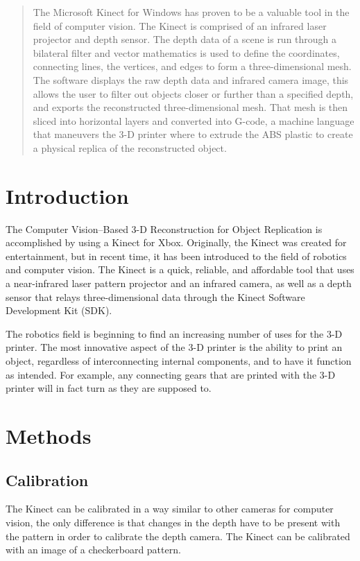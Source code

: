 \documentclass[pdftex,10.5pt]{report}
\begin{document}


\begin{abstract}
The Microsoft Kinect for Windows has proven to be a valuable tool in the field of computer vision. The Kinect is comprised of an infrared laser projector and depth sensor. The depth data of a scene is run through a bilateral filter and vector mathematics is used to define the coordinates, connecting lines, the vertices, and edges to form a three-dimensional mesh. The software displays the raw depth data and infrared camera image, this allows the user to filter out objects closer or further than a specified depth, and exports the reconstructed three-dimensional mesh. That mesh is then sliced into horizontal layers and converted into G-code, a machine language that maneuvers the 3-D printer where to extrude the ABS plastic to create a physical replica of the reconstructed object. 
\end{abstract}

\tableofcontents

\section{Introduction}
The Computer Vision--Based 3-D Reconstruction for Object Replication is accomplished by using a Kinect for Xbox. Originally, the Kinect was created for entertainment, but in recent time, it has been introduced to the field of robotics and computer vision. The Kinect is a quick, reliable, and affordable tool that uses a near-infrared laser pattern projector and an infrared camera, as well as a depth sensor that relays three-dimensional data through the Kinect Software Development Kit (SDK).

The robotics field is beginning to find an increasing number of uses for the 3-D printer. The most innovative aspect of the 3-D printer is the ability to print an object, regardless of interconnecting internal components, and to have it function as intended. For example, any connecting gears that are printed with the 3-D printer will in fact turn as they are supposed to.

\section{Methods}
\subsection{Calibration}
The Kinect can be calibrated in a way similar to other cameras for computer vision, the only difference is that changes in the depth have to be present  with the pattern in order to calibrate the depth camera. The Kinect can be calibrated with an image of a checkerboard pattern.
\end{document}
